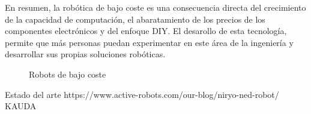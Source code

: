 En resumen, la robótica de bajo coste es una consecuencia directa del crecimiento de la capacidad de computación, 
el abaratamiento de los precios de los componentes electrónicos y del enfoque \acs{DIY}.
El desarollo de esta tecnología, permite que más personas puedan experimentar en este área de la ingeniería y desarrollar 
sus propias soluciones robóticas.
\begin{figure} [ht!]
  \centering    
  \hspace{1cm}
  \caption{Robots de bajo coste}
\end{figure}







Estado del arte
https://www.active-robots.com/our-blog/niryo-ned-robot/
KAUDA 